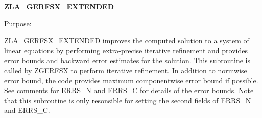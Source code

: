 {\bfseries Z\+L\+A\+\_\+\+G\+E\+R\+F\+S\+X\+\_\+\+E\+X\+T\+E\+N\+D\+E\+D} 

 \begin{DoxyParagraph}{Purpose\+: }
\begin{DoxyVerb} ZLA_GERFSX_EXTENDED improves the computed solution to a system of
 linear equations by performing extra-precise iterative refinement
 and provides error bounds and backward error estimates for the solution.
 This subroutine is called by ZGERFSX to perform iterative refinement.
 In addition to normwise error bound, the code provides maximum
 componentwise error bound if possible. See comments for ERRS_N
 and ERRS_C for details of the error bounds. Note that this
 subroutine is only resonsible for setting the second fields of
 ERRS_N and ERRS_C.\end{DoxyVerb}
 
\end{DoxyParagraph}

